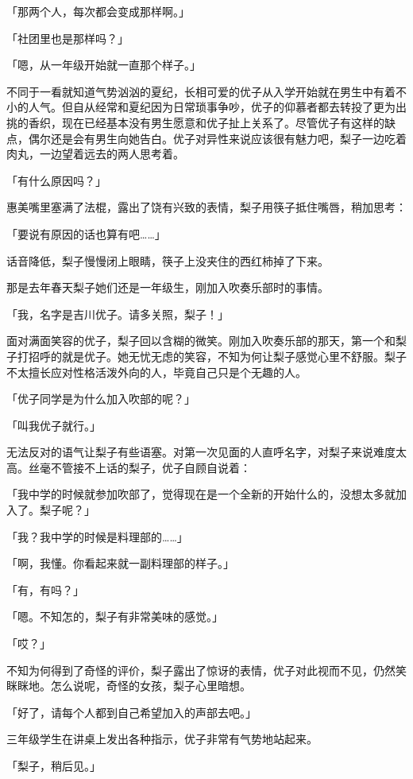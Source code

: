 \documentclass[UTF8]{ctexart}
\begin{document}
    「那两个人，每次都会变成那样啊。」

    「社团里也是那样吗？」

    「嗯，从一年级开始就一直那个样子。」

    不同于一看就知道气势汹汹的夏纪，长相可爱的优子从入学开始就在男生中有着不小的人气。但自从经常和夏纪因为日常琐事争吵，优子的仰慕者都去转投了更为出挑的香织，现在已经基本没有男生愿意和优子扯上关系了。尽管优子有这样的缺点，偶尔还是会有男生向她告白。优子对异性来说应该很有魅力吧，梨子一边吃着肉丸，一边望着远去的两人思考着。

    「有什么原因吗？」

    惠美嘴里塞满了法棍，露出了饶有兴致的表情，梨子用筷子抵住嘴唇，稍加思考：

    「要说有原因的话也算有吧……」

    话音降低，梨子慢慢闭上眼睛，筷子上没夹住的西红柿掉了下来。

    那是去年春天梨子她们还是一年级生，刚加入吹奏乐部时的事情。

    「我，名字是吉川优子。请多关照，梨子！」

    面对满面笑容的优子，梨子回以含糊的微笑。刚加入吹奏乐部的那天，第一个和梨子打招呼的就是优子。她无忧无虑的笑容，不知为何让梨子感觉心里不舒服。梨子不太擅长应对性格活泼外向的人，毕竟自己只是个无趣的人。

    「优子同学是为什么加入吹部的呢？」

    「叫我优子就行。」

    无法反对的语气让梨子有些语塞。对第一次见面的人直呼名字，对梨子来说难度太高。丝毫不管接不上话的梨子，优子自顾自说着：

    「我中学的时候就参加吹部了，觉得现在是一个全新的开始什么的，没想太多就加入了。梨子呢？」

    「我？我中学的时候是料理部的……」

    「啊，我懂。你看起来就一副料理部的样子。」

    「有，有吗？」

    「嗯。不知怎的，梨子有非常美味的感觉。」

    「哎？」

    不知为何得到了奇怪的评价，梨子露出了惊讶的表情，优子对此视而不见，仍然笑眯眯地。怎么说呢，奇怪的女孩，梨子心里暗想。

    「好了，请每个人都到自己希望加入的声部去吧。」

    三年级学生在讲桌上发出各种指示，优子非常有气势地站起来。

    「梨子，稍后见。」
\end{document}
